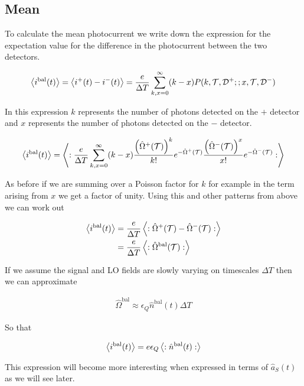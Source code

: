 \documentclass[12pt]{article}
\newcommand{\ep}{\epsilon}
\newcommand{\mc}[1]{\mathcal{#1}}
\begin{document}
\subsection{Mean}

To calculate the mean photocurrent we write down the expression for the expectation value for the difference in the photocurrent between the two detectors.

\begin{align}
\Braket{i^{\text{bal}}(t)} = \Braket{i^+(t) - i^-(t)} = \frac{e}{\Delta T}\sum_{k,x=0}^{\infty} (k-x) P(k,\mc{T}, \mc{D}^+;;x,\mc{T}, \mc{D}^-)
\end{align}

In this expression $k$ represents the number of photons detected on the $+$ detector and $x$ represents the number of photons detected on the $-$ detector.

\begin{align}
\Braket{i^{\text{bal}}(t)} = \Braket{:\frac{e}{\Delta T}\sum_{k,x=0}^{\infty} (k-x) \frac{\left(\hat{\Omega}^+(\mc{T})\right)^k}{k!} e^{-\hat{\Omega}^+(\mc{T})}\frac{\left(\hat{\Omega}^-(\mc{T})\right)^x}{x!} e^{-\hat{\Omega}^-(\mc{T})}:}
\end{align}

As before if we are summing over a Poisson factor for $k$ for example in the term arising from $x$ we get a factor of unity. Using this and other patterns from above we can work out

\begin{align}
\Braket{i^{\text{bal}}(t)} &= \frac{e}{\Delta T}\Braket{:\hat{\Omega}^+(\mc{T}) - \hat{\Omega}^-(\mc{T}):}\\
&= \frac{e}{\Delta T}\Braket{:\hat{\Omega}^{\text{bal}}(\mc{T}):}
\end{align}

If we assume the signal and LO fields are slowly varying on timescales $\Delta T$ then we can approximate

\begin{align}
\hat{\Omega}^{\text{bal}} \approx \ep_Q\hat{n}^{\text{bal}}(t)\Delta T
\end{align}

So that

\begin{align}
\Braket{i^{\text{bal}}(t)} = e \ep_Q\Braket{:\hat{n}^{\text{bal}}(t):}
\end{align}

This expression will become more interesting when expressed in terms of $\hat{a}_S(t)$ as we will see later.
\end{document}
